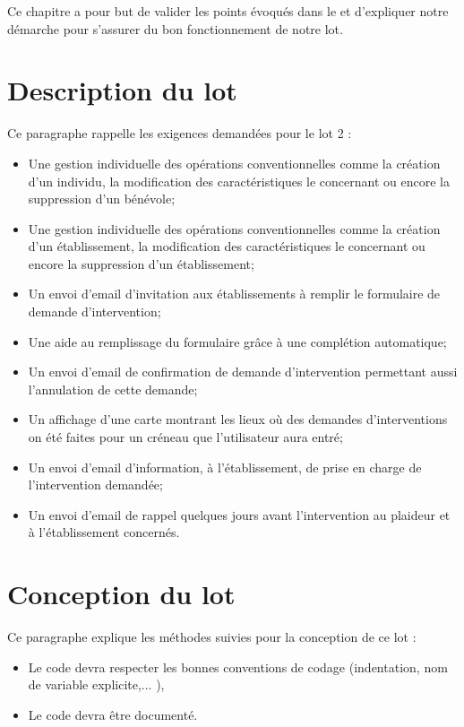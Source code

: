 
	Ce chapitre a pour but de valider les points évoqués dans le \DSE{} et d'expliquer notre démarche pour s'assurer du bon fonctionnement de notre lot.
	
\section{Description du lot}
	Ce paragraphe rappelle les exigences demandées pour le lot 2 :
	\begin{itemize}
		\item Une gestion individuelle des opérations conventionnelles comme la création d'un individu, la modification des caractéristiques le concernant ou encore la suppression d'un bénévole;
		\item Une gestion individuelle des opérations conventionnelles comme la création d'un établissement, la modification des caractéristiques le concernant ou encore la suppression d'un établissement;
		\item Un envoi d'email d'invitation aux établissements à remplir le formulaire de demande d'intervention;
		\item Une aide au remplissage du formulaire grâce à une complétion automatique;
		\item Un envoi d'email de confirmation de demande d'intervention permettant aussi l'annulation de cette demande;
		\item Un affichage d'une carte montrant les lieux où des demandes d'interventions on été faites pour un créneau que l'utilisateur aura entré;
		\item Un envoi d'email d'information, à l'établissement, de prise en charge de l'intervention demandée;
		\item Un envoi d'email de rappel quelques jours avant l'intervention au plaideur et à l'établissement concernés.
	\end{itemize}
	
\section{Conception du lot}
	Ce paragraphe explique les méthodes suivies pour la conception de ce lot :
	\begin{itemize}
		\item Le code devra respecter les bonnes conventions de codage (indentation, nom de variable explicite,... ),
		\item Le code devra être documenté.
	\end{itemize}
	
